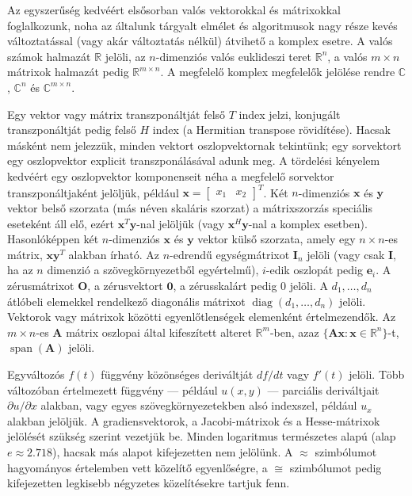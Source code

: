 \documentclass[
  magyar,
  11pt]{article}
\begin{document}
Az egyszerűség kedvéért elsősorban valós vektorokkal és mátrixokkal
foglalkozunk, noha az általunk tárgyalt elmélet és algoritmusok nagy
része kevés változtatással (vagy akár változtatás nélkül) átvihető a
komplex esetre. A valós számok halmazát \(\mathbb{R}\) jelöli, az
\(n\)-dimenziós valós euklideszi teret \(\mathbb{R}^n\), a valós
\(m \times n\) mátrixok halmazát pedig \(\mathbb{R}^{m \times n}\). A
megfelelő komplex megfelelők jelölése rendre \(\mathbb{C}\),
\(\mathbb{C}^n\) és \(\mathbb{C}^{m \times n}\).

Egy vektor vagy mátrix transzponáltját felső \(T\) index jelzi,
konjugált transzponáltját pedig felső \(H\) index (a Hermitian transpose
rövidítése). Hacsak másként nem jelezzük, minden vektort oszlopvektornak
tekintünk; egy sorvektort egy oszlopvektor explicit transzponálásával
adunk meg. A tördelési kényelem kedvéért egy oszlopvektor komponenseit
néha a megfelelő sorvektor transzponáltjaként jelöljük, például
\(\mathbf{x} = \begin{bmatrix} x_1 & x_2 \end{bmatrix}^T\). Két
\(n\)-dimenziós \(\mathbf{x}\) és \(\mathbf{y}\) vektor belső szorzata
(más néven skaláris szorzat) a mátrixszorzás speciális eseteként áll
elő, ezért \(\mathbf{x}^T\mathbf{y}\)-nal jelöljük (vagy
\(\mathbf{x}^H\mathbf{y}\)-nal a komplex esetben). Hasonlóképpen két
\(n\)-dimenziós \(\mathbf{x}\) és \(\mathbf{y}\) vektor külső szorzata,
amely egy \(n \times n\)-es mátrix, \(\mathbf{x}\mathbf{y}^T\) alakban
írható. Az \(n\)-edrendű egységmátrixot \(\mathbf{I}_n\) jelöli (vagy
csak \(\mathbf{I}\), ha az \(n\) dimenzió a szövegkörnyezetből
egyértelmű), \(i\)-edik oszlopát pedig \(\mathbf{e}_i\). A zérusmátrixot
\(\mathbf{O}\), a zérusvektort \(\mathbf{0}\), a zérusskalárt pedig
\(0\) jelöli. A \(d_1, \ldots, d_n\) átlóbeli elemekkel rendelkező
diagonális mátrixot \(\operatorname{diag}(d_1, \ldots, d_n)\) jelöli.
Vektorok vagy mátrixok közötti egyenlőtlenségek elemenként
értelmezendők. Az \(m \times n\)-es \(\mathbf{A}\) mátrix oszlopai által
kifeszített alteret \(\mathbb{R}^m\)-ben, azaz
\(\{\mathbf{A}\mathbf{x}: \mathbf{x} \in \mathbb{R}^n\}\)-t,
\(\operatorname{span}(\mathbf{A})\) jelöli.

Egyváltozós \(f(t)\) függvény közönséges deriváltját \(df/dt\) vagy
\(f'(t)\) jelöli. Több változóban értelmezett függvény --- például
\(u(x,y)\) --- parciális deriváltjait \(\partial u/\partial x\) alakban,
vagy egyes szövegkörnyezetekben alsó indexszel, például \(u_x\) alakban
jelöljük. A gradiensvektorok, a Jacobi-mátrixok és a Hesse-mátrixok
jelölését szükség szerint vezetjük be. Minden logaritmus természetes
alapú (alap \(e \approx 2.718\)), hacsak más alapot kifejezetten nem
jelölünk. A \(\approx\) szimbólumot hagyományos értelemben vett közelítő
egyenlőségre, a \(\cong\) szimbólumot pedig kifejezetten legkisebb
négyzetes közelítésekre tartjuk fenn.
\end{document}
